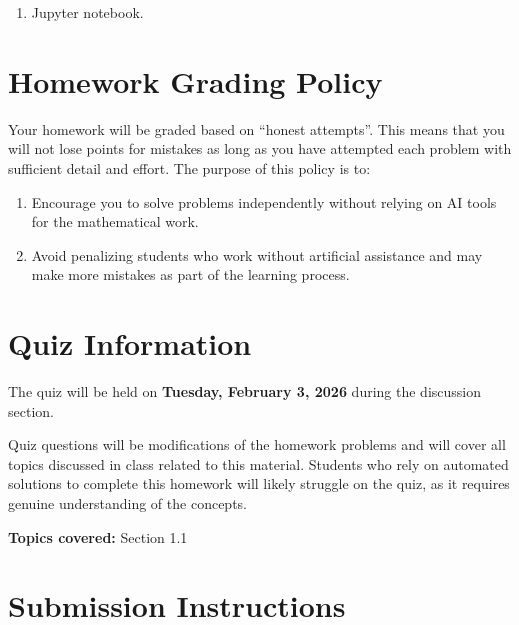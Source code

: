 \documentclass[reqno]{exam}
\begin{document}
\begin{enumerate}
\begin{solution}
\begin{enumerate}
  \item In $[2^n, 2^{n+1})$ the spacing between consecutive numbers is $2^{n-d} = 2^{n-23}$. At $n = d = 23$, the spacing equals $2^0 = 1$, so all integers from $2^{23}$ to $2^{24} - 1$ appear. At $n = d + 1 = 24$, the spacing is $2^1 = 2$, so only even integers appear. The smallest missing positive integer is therefore $2^{24} + 1$.
\end{enumerate}

\end{solution}

\item

Jupyter notebook.

\end{enumerate}


\newpage
\section*{Homework Grading Policy}

Your homework will be graded based on ``honest attempts''.
This means that you will not lose points for mistakes as long as you have attempted each problem with sufficient detail and effort.
The purpose of this policy is to:
\begin{enumerate}
  \item Encourage you to solve problems independently without relying on AI tools for the mathematical work.
  \item Avoid penalizing students who work without artificial assistance and may make more mistakes as part of the learning process.
\end{enumerate}

\section*{Quiz Information}

The quiz will be held on {\bf Tuesday, February 3, 2026} during the discussion section.

Quiz questions will be modifications of the homework problems and will cover all topics discussed in class related to this material. Students who rely on automated solutions to complete this homework will likely struggle on the quiz, as it requires genuine understanding of the concepts.

\textbf{Topics covered:} Section 1.1 


\section*{Submission Instructions}
\end{document}
